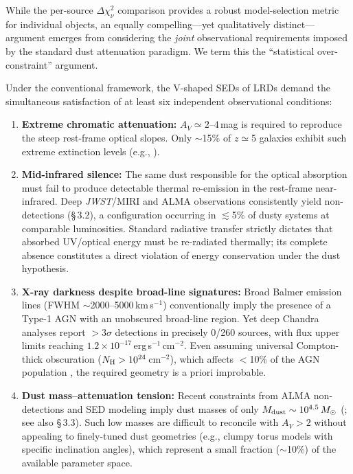 \documentclass[twocolumn]{aastex631}
\begin{document}
While the per-source $\Delta\chi^2_\nu$ comparison provides a robust
model-selection metric for individual objects, an equally compelling---yet
qualitatively distinct---argument emerges from considering the \emph{joint}
observational requirements imposed by the standard dust attenuation paradigm.
We term this the ``statistical over-constraint'' argument.

Under the conventional framework, the V-shaped SEDs of LRDs demand the
simultaneous satisfaction of at least six independent observational conditions:

\begin{enumerate}
    \item \textbf{Extreme chromatic attenuation:} $A_V \simeq 2$--$4$\,mag is
    required to reproduce the steep rest-frame optical slopes. Only $\sim$15\%
of $z\simeq$5 galaxies exhibit such extreme extinction levels
(e.g., \citet{Calzetti2000}).

    \item \textbf{Mid-infrared silence:} The same dust responsible for the
optical absorption must fail to produce detectable thermal re-emission in
the rest-frame near-infrared. Deep \textit{JWST}/MIRI and ALMA observations
consistently yield non-detections (\S\,3.2), a configuration occurring in
$\lesssim$5\% of dusty systems at comparable luminosities.
Standard radiative transfer strictly dictates that absorbed UV/optical energy
must be re-radiated thermally; its complete absence constitutes a direct
violation of energy conservation under the dust hypothesis.

    \item \textbf{X-ray darkness despite broad-line signatures:} Broad Balmer
emission lines (FWHM $\sim$2000--5000\,km\,s$^{-1}$) conventionally imply
the presence of a Type-1 AGN with an unobscured broad-line region.
Yet deep Chandra analyses report $>$3$\sigma$ detections in precisely
0/260 sources, with flux upper limits reaching
$1.2\times10^{-17}$\,erg\,s$^{-1}$\,cm$^{-2}$. Even assuming universal
Compton-thick obscuration ($N_{\rm H}>10^{24}$\,cm$^{-2}$), which affects
$<$10\% of the AGN population \citep[e.g.,][]{Maiolino2024},
the required geometry is a priori improbable.

    \item \textbf{Dust mass--attenuation tension:} Recent constraints from
ALMA non-detections and SED modeling imply dust masses of only
$M_{\rm dust}\sim10^{4.5}\,M_\odot$
(\citealt{Billand2026}; see also \S\,3.3). Such low masses are
difficult to reconcile with $A_V>2$ without appealing to finely-tuned
dust geometries (e.g., clumpy torus models with specific inclination angles),
which represent a small fraction ($\sim$10\%) of the available parameter space.


\end{enumerate}
\end{document}
